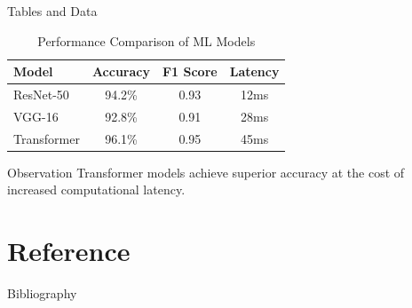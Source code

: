 \documentclass{ctexbeamer}
\begin{document}
\begin{frame}{Tables and Data}
    \begin{table}
        \centering
        \caption{Performance Comparison of ML Models}
        \begin{tabular}{lccc}
            \toprule
            \textbf{Model} & \textbf{Accuracy} & \textbf{F1 Score} & \textbf{Latency} \\
            \midrule
            ResNet-50 & 94.2\% & 0.93 & 12ms \\
            VGG-16 & 92.8\% & 0.91 & 28ms \\
            Transformer & 96.1\% & 0.95 & 45ms \\
            \bottomrule
        \end{tabular}
    \end{table}
    
    \vspace{0.3cm}
    \begin{alertblock}{Observation}
        Transformer models achieve superior accuracy at the cost of increased computational latency.
    \end{alertblock}
\end{frame}

\section{Reference}

\begin{frame}[allowframebreaks]{Bibliography}
    \nocite{*}
    
    
\end{frame}
\end{document}
